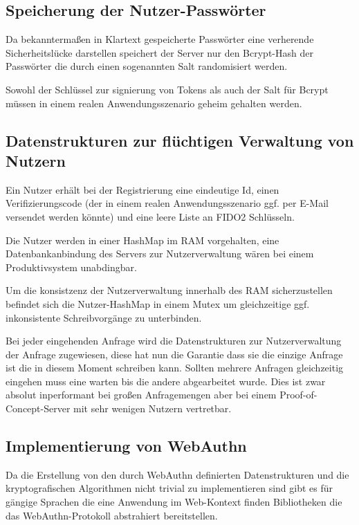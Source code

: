 \documentclass[journal]{IEEEtran}
\begin{document}
\subsection{Speicherung der Nutzer-Passwörter}

Da bekanntermaßen in Klartext gespeicherte Passwörter eine verherende
Sicherheitslücke darstellen speichert der Server nur den Bcrypt-Hash der
Passwörter die durch einen sogenannten Salt randomisiert werden.

Sowohl der Schlüssel zur signierung von Tokens als auch der Salt für Bcrypt
müssen in einem realen Anwendungsszenario geheim gehalten werden.

\subsection{Datenstrukturen zur flüchtigen Verwaltung von Nutzern}

Ein Nutzer erhält bei der Registrierung eine eindeutige Id, einen
Verifizierungscode (der in einem realen Anwendungsszenario ggf. per E-Mail
versendet werden könnte) und eine leere Liste an FIDO2 Schlüsseln.

Die Nutzer werden in einer HashMap im RAM vorgehalten, eine Datenbankanbindung
des Servers zur Nutzerverwaltung wären bei einem Produktivsystem unabdingbar.

Um die konsistzenz der Nutzerverwaltung innerhalb des RAM sicherzustellen
befindet sich die Nutzer-HashMap in einem Mutex um gleichzeitige ggf.
inkonsistente Schreibvorgänge zu unterbinden.

Bei jeder eingehenden Anfrage wird die Datenstrukturen zur Nutzerverwaltung der
Anfrage zugewiesen, diese hat nun die Garantie dass sie die einzige Anfrage ist
die in diesem Moment schreiben kann. Sollten mehrere Anfragen gleichzeitig
eingehen muss eine warten bis die andere abgearbeitet wurde. Dies ist zwar
absolut inperformant bei großen Anfragemengen aber bei einem
Proof-of-Concept-Server mit sehr wenigen Nutzern vertretbar.

\subsection{Implementierung von WebAuthn}

Da die Erstellung von den durch WebAuthn definierten Datenstrukturen und die
kryptografischen Algorithmen nicht trivial zu implementieren sind gibt es für
gängige Sprachen die eine Anwendung im Web-Kontext finden Bibliotheken die das
WebAuthn-Protokoll abstrahiert bereitstellen.
\end{document}
